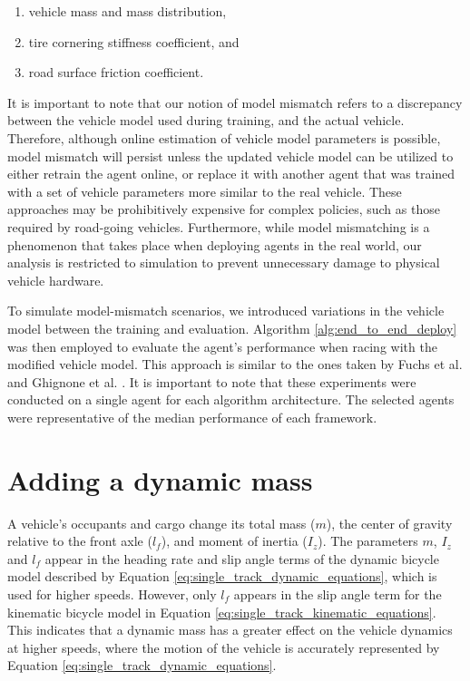 \begin{enumerate}
\item vehicle mass and mass distribution,
\item tire cornering stiffness coefficient, and
\item road surface friction coefficient.
\end{enumerate}


It is important to note that our notion of model mismatch refers to a discrepancy between the vehicle model used during training, and the actual vehicle.
Therefore, although online estimation of vehicle model parameters is possible, model mismatch will persist unless the updated vehicle model can be utilized to either retrain the agent online, or replace it with another agent that was trained with a set of vehicle parameters more similar to the real vehicle.
These approaches may be prohibitively expensive for complex policies, such as those required by road-going vehicles.
Furthermore, while model mismatching is a phenomenon that takes place when deploying agents in the real world, our analysis is restricted to simulation to prevent unnecessary damage to physical vehicle hardware.

To simulate model-mismatch scenarios, we introduced variations in the vehicle model between the training and evaluation.
Algorithm \ref{alg:end_to_end_deploy} was then employed to evaluate the agent's performance when racing with the modified vehicle model.
This approach is similar to the ones taken by Fuchs et al. \cite{Fuchs2021} and Ghignone et al. \cite{Ghignone2022}.
It is important to note that these experiments were conducted on a single agent for each algorithm architecture.
The selected agents were representative of the median performance of each framework.





\section{Adding a dynamic mass}

A vehicle's occupants and cargo change its total mass ($m$), the center of gravity relative to the front axle ($l_f$), and moment of inertia ($I_z$).
The parameters $m$, $I_z$ and $l_f$ appear in the heading rate and slip angle terms of the dynamic bicycle model described by Equation \ref{eq:single_track_dynamic_equations}, which is used for higher speeds.
However, only $l_f$ appears in the slip angle term for the kinematic bicycle model in Equation \ref{eq:single_track_kinematic_equations}.
This indicates that a dynamic mass has a greater effect on the vehicle dynamics at higher speeds, where the motion of the vehicle is accurately represented by Equation \ref{eq:single_track_dynamic_equations}.


